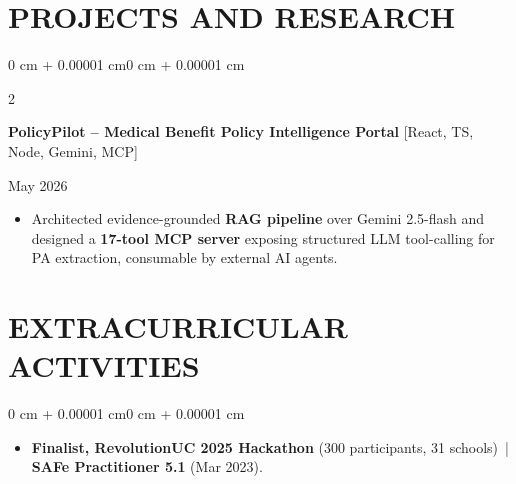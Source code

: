 \documentclass[10pt, letterpaper]{article}
\newenvironment{highlights}{
    \begin{itemize}[
        topsep=0.10 cm,
        parsep=0.06 cm,
        partopsep=0pt,
        itemsep=0.06 cm,
        leftmargin=12pt
    ]
}{
    \end{itemize}
}
\newenvironment{onecolentry}{
    \begin{adjustwidth}{0 cm + 0.00001 cm}{0 cm + 0.00001 cm}
}{
    \end{adjustwidth}
}
\newenvironment{twocolentry}[2][]{
    \onecolentry
    \def\secondColumn{#2}
    \setcolumnwidth{\fill, 4.5 cm}
    \begin{paracol}{2}
}{
    \switchcolumn \raggedleft \secondColumn
    \end{paracol}
    \endonecolentry
}
\begin{document}
\section{PROJECTS AND RESEARCH}
\begin{twocolentry}{May 2026}
\textbf{PolicyPilot -- Medical Benefit Policy Intelligence Portal} [React, TS, Node, Gemini, MCP]
\end{twocolentry}
\begin{highlights}
  \item Architected evidence-grounded \textbf{RAG pipeline} over Gemini 2.5-flash and designed a \textbf{17-tool MCP server} exposing structured LLM tool-calling for PA extraction, consumable by external AI agents.
\end{highlights}

\section{EXTRACURRICULAR ACTIVITIES}
\begin{onecolentry}
\begin{highlights}
  \item \textbf{Finalist, RevolutionUC 2025 Hackathon} (300 participants, 31 schools) \,|\, \textbf{SAFe Practitioner 5.1} (Mar 2023).
\end{highlights}
\end{onecolentry}
\end{document}
